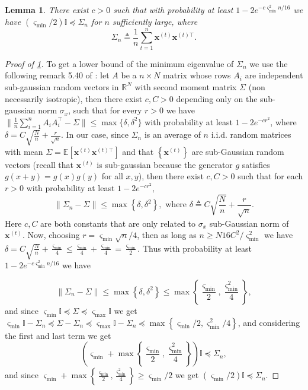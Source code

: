 \documentclass{article} %
\newtheorem{lemma}[theorem]{Lemma}
\begin{document}
\begin{lemma}\label{lemma:STEP I}
There exist $c>0$ such that with probability at least $1-2 e^{-c \varsigma_{\min}^{2} n / 16}$ we have $\left(\varsigma_{\min} / 2\right) \mathbb{I} \preccurlyeq \Sigma_{n}$ for $n$ sufficiently large, where 
$$\Sigma_{n} \triangleq  \frac{1}{n} \sum_{t=1}^n \mathbf{x}^{(t)} \mathbf{x}^{(t)\top}.$$
\end{lemma}
\begin{proof}[Proof of \cref{lemma:STEP I}]
To get a lower bound of the minimum eigenvalue of $\Sigma_{n}$ we use the following remark 5.40 of \cite{vershynin2010introduction}: let $A$ be a $n \times N$ matrix whose rows $A_i$ are independent sub-gaussian random vectors in $\mathbb{R}^N$ with second moment matrix $\Sigma$ (non necessarily isotropic), then there exist $c,C>0$ depending only on the sub-gaussian norm $\sigma_x$, such that for every $r >0$ we have $\|\tfrac{1}{n}\sum_{i=1}^n A_i A_i^{\top}-\Sigma\| \leq \max \{\delta, \delta^2\}$ with probability at least $1-2e^{-cr^2}$, where $\delta = C \sqrt{\tfrac{N}{n}}+\tfrac{r}{\sqrt{n}}$. In our case, since $\Sigma_{n}$ is an average of $n$ i.i.d. random matrices with mean $\Sigma=\mathbb{E}\left[\mathbf{x}^{(t)} \mathbf{x}^{(t) \top}\right]$ and that $\left\{\mathbf{x}^{(t)}\right\}$ are sub-Gaussian random vectors (recall  that $\mathbf{x}^{(t)}$ is sub-gaussian because the generator $g$ satisfies $g(x+y)=g(x)g(y)$ for all $x,y$), then there exist $c, C>0$ such that for each $r >0$ with probability at least $1-2 e^{-c r^{2}}$,
$$
\left\|\Sigma_{n}-\Sigma\right\| \leq \max \left\{\delta, \delta^{2}\right\}, \text { where } \delta\triangleq  C \sqrt{\frac{N}{n}}+\frac{r}{\sqrt{n}}.
$$
\noindent
Here $c, C$ are both constants that are only related to $\sigma_x$ sub-Gaussian norm of $\mathbf{x}^{(t)}$. Now, choosing $r=\varsigma_{\min} \sqrt{n} / 4$, then as long as $n \geq N16 C^{2} / \varsigma_{\min}^{2}$ we have $\delta = C \sqrt{\frac{N}{n}}+\frac{\varsigma_{\min}}{4} \leq \frac{\varsigma_{\min}}{4} + \frac{\varsigma_{\min}}{4}= \frac{\varsigma_{\min}}{2}$. Thus with probability at least $1-2 e^{-c \varsigma_{\min}^{2} n / 16}$ we have 

$$
\left\|\Sigma_{n}-\Sigma\right\| \leq \max \left\{\delta, \delta^{2}\right\} \leq \max \left\{\frac{\varsigma_{\min}}{2},\frac{\varsigma_{\min}^2}{4}\right\},
$$
\noindent
and since $\varsigma_{\min} \mathbb{I} \preccurlyeq \Sigma \preccurlyeq \varsigma_{\max} \mathbb{I}$ we get $\varsigma_{\min} \mathbb{I} - \Sigma_n \preccurlyeq \Sigma - \Sigma_n \preccurlyeq \varsigma_{\max} \mathbb{I} - \Sigma_n \preccurlyeq \max \left\{\varsigma_{\min}/2,\varsigma_{\min}^2/4\right\}$, and considering the first and last term we get
$$
\left(\varsigma_{\min} + \max \left\{\frac{\varsigma_{\min}}{2},\frac{\varsigma_{\min}^2}{4}\right\} \right) \mathbb{I} \preccurlyeq \Sigma_{n},
$$
\noindent
and since $\varsigma_{\min} + \max \left\{\frac{\varsigma_{\min}}{2},\frac{\varsigma_{\min}^2}{4}\right\} \geq \varsigma_{\min}/2$ we get $\left(\varsigma_{\min} / 2\right) \mathbb{I} \preccurlyeq \Sigma_{n}$.
\end{proof}
\end{document}
